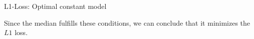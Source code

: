 \begin{vbframe}{L1-Loss: Optimal constant model}
\begin{itemize}
  Since the median fulfills these conditions, we can conclude that it minimizes 
  the $L1$ loss.
\end{itemize}









\end{vbframe}


\endlecture

